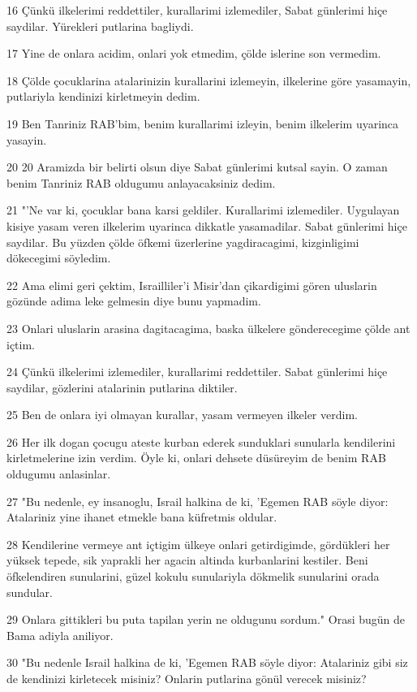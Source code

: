 \par 16 Çünkü ilkelerimi reddettiler, kurallarimi izlemediler, Sabat günlerimi hiçe saydilar. Yürekleri putlarina bagliydi.
\par 17 Yine de onlara acidim, onlari yok etmedim, çölde islerine son vermedim.
\par 18 Çölde çocuklarina atalarinizin kurallarini izlemeyin, ilkelerine göre yasamayin, putlariyla kendinizi kirletmeyin dedim.
\par 19 Ben Tanriniz RAB'bim, benim kurallarimi izleyin, benim ilkelerim uyarinca yasayin.
\par 20 20 Aramizda bir belirti olsun diye Sabat günlerimi kutsal sayin. O zaman benim Tanriniz RAB oldugumu anlayacaksiniz dedim.
\par 21 "'Ne var ki, çocuklar bana karsi geldiler. Kurallarimi izlemediler. Uygulayan kisiye yasam veren ilkelerim uyarinca dikkatle yasamadilar. Sabat günlerimi hiçe saydilar. Bu yüzden çölde öfkemi üzerlerine yagdiracagimi, kizginligimi dökecegimi söyledim.
\par 22 Ama elimi geri çektim, Israilliler'i Misir'dan çikardigimi gören uluslarin gözünde adima leke gelmesin diye bunu yapmadim.
\par 23 Onlari uluslarin arasina dagitacagima, baska ülkelere gönderecegime çölde ant içtim.
\par 24 Çünkü ilkelerimi izlemediler, kurallarimi reddettiler. Sabat günlerimi hiçe saydilar, gözlerini atalarinin putlarina diktiler.
\par 25 Ben de onlara iyi olmayan kurallar, yasam vermeyen ilkeler verdim.
\par 26 Her ilk dogan çocugu ateste kurban ederek sunduklari sunularla kendilerini kirletmelerine izin verdim. Öyle ki, onlari dehsete düsüreyim de benim RAB oldugumu anlasinlar.
\par 27 "Bu nedenle, ey insanoglu, Israil halkina de ki, 'Egemen RAB söyle diyor: Atalariniz yine ihanet etmekle bana küfretmis oldular.
\par 28 Kendilerine vermeye ant içtigim ülkeye onlari getirdigimde, gördükleri her yüksek tepede, sik yaprakli her agacin altinda kurbanlarini kestiler. Beni öfkelendiren sunularini, güzel kokulu sunulariyla dökmelik sunularini orada sundular.
\par 29 Onlara gittikleri bu puta tapilan yerin ne oldugunu sordum." Orasi bugün de Bama adiyla aniliyor.
\par 30 "Bu nedenle Israil halkina de ki, 'Egemen RAB söyle diyor: Atalariniz gibi siz de kendinizi kirletecek misiniz? Onlarin putlarina gönül verecek misiniz?
